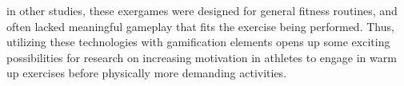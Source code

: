 in other studies, these exergames were designed for general fitness routines, and often lacked meaningful gameplay that fits the exercise being performed.  Thus, utilizing these technologies with gamification elements opens up some exciting possibilities for research on increasing motivation in athletes to  engage in warm up exercises before physically more demanding activities. 
